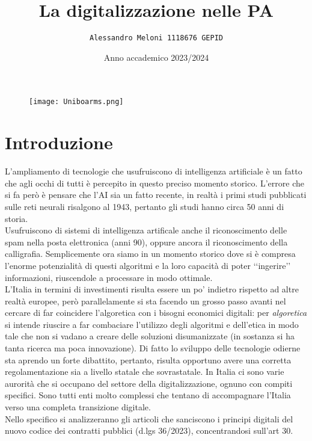 \documentclass{article}
\title{\huge\textbf{La digitalizzazione nelle PA}}
\author{\texttt{Alessandro Meloni 1118676 GEPID}}
\date{Anno accademico 2023/2024}
\begin{document}
\begin{figure}
    \centering
    \texttt{[image: Uniboarms.png]}
\end{figure}
\maketitle

\centering \tableofcontents

\newpage\centering
\section{Introduzione}
\begin{justify}
L'ampliamento di tecnologie che usufruiscono di intelligenza artificiale è un fatto che agli occhi di tutti è percepito in questo preciso momento storico. L'errore che si fa però è pensare che l'AI sia un fatto recente, in realtà i primi studi pubblicati sulle reti neurali risalgono al 1943, pertanto gli studi hanno circa 50 anni di storia.\citep{mcculloch1943logical}\\ Usufruiscono di sistemi di intelligenza artificale anche il riconoscimento delle spam nella posta elettronica (anni 90), oppure ancora il riconoscimento della calligrafia. Semplicemente ora siamo in un momento storico dove si è compresa l'enorme potenzialità di questi algoritmi e la loro capacità di poter ‘‘ingerire’’ informazioni, riuscendole a processare in modo ottimale.\\
L'Italia in termini di investimenti risulta essere un po' indietro rispetto ad altre realtà europee, però parallelamente si sta facendo un grosso passo avanti nel cercare di far coincidere l'algoretica con i bisogni economici digitali: per \textit{algoretica} si intende riuscire a far combaciare l'utilizzo degli algoritmi e dell'etica in modo tale che non si vadano a creare delle soluzioni disumanizzate (in sostanza si ha tanta ricerca ma poca innovazione).
Di fatto lo sviluppo delle tecnologie odierne sta aprendo un forte dibattito, pertanto, risulta opportuno avere una corretta regolamentazione sia a livello statale che sovrastatale.
In Italia ci sono varie aurorità che si occupano del settore della digitalizzazione, ognuno con compiti specifici.
Sono tutti enti molto complessi che tentano di accompagnare l'Italia verso una completa transizione digitale.\\
Nello specifico si analizzeranno gli articoli che sanciscono i principi digitali del nuovo codice dei contratti pubblici (d.lgs 36/2023), concentrandosi sull'art 30.\\

\end{justify}
\end{document}
